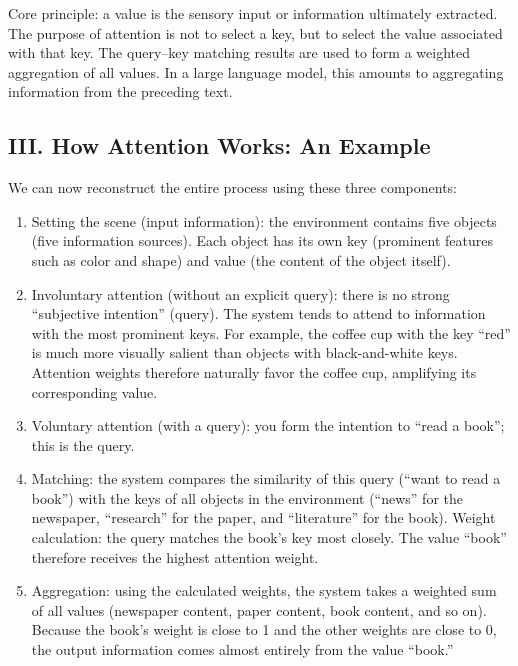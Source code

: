 Core principle: a value is the sensory input or information ultimately extracted. The purpose of attention is not to select a key, but to select the value associated with that key. The query--key matching results are used to form a weighted aggregation of all values. In a large language model, this amounts to aggregating information from the preceding text.

\hypertarget{iii.-how-attention-works-an-example}{%
\subsection{III. How Attention Works: An Example}\label{iii.-how-attention-works-an-example}}

We can now reconstruct the entire process using these three components:

\begin{enumerate}
\def\labelenumi{\arabic{enumi}.}
\item
  Setting the scene (input information): the environment contains five objects (five information sources). Each object has its own key (prominent features such as color and shape) and value (the content of the object itself).
\item
  Involuntary attention (without an explicit query): there is no strong ``subjective intention'' (query). The system tends to attend to information with the most prominent keys. For example, the coffee cup with the key ``red'' is much more visually salient than objects with black-and-white keys. Attention weights therefore naturally favor the coffee cup, amplifying its corresponding value.
\item
  Voluntary attention (with a query): you form the intention to ``read a book''; this is the query.
\item
  Matching: the system compares the similarity of this query (``want to read a book'') with the keys of all objects in the environment (``news'' for the newspaper, ``research'' for the paper, and ``literature'' for the book). Weight calculation: the query matches the book's key most closely. The value ``book'' therefore receives the highest attention weight.
\item
  Aggregation: using the calculated weights, the system takes a weighted sum of all values (newspaper content, paper content, book content, and so on). Because the book's weight is close to 1 and the other weights are close to 0, the output information comes almost entirely from the value ``book.''
\end{enumerate}

